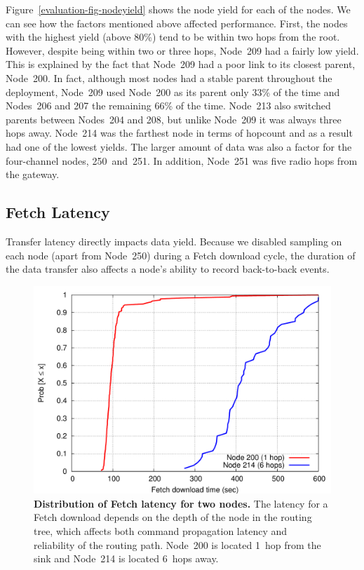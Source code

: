 Figure~\ref{evaluation-fig-nodeyield} shows the node yield for each of the
nodes. We can see how the factors mentioned above affected performance.
First, the nodes with the highest yield (above 80\%) tend to be within two
hops from the root. However, despite being within two or three hops, Node~209
had a fairly low yield. This is explained by the fact that Node~209 had a
poor link to its closest parent, Node~200. In fact, although most nodes had a
stable parent throughout the deployment, Node~209 used Node~200 as its parent
only 33\% of the time and Nodes~206 and 207 the remaining 66\% of the time.
Node~213 also switched parents between Nodes~204 and 208, but unlike Node~209
it was always three hops away. Node~214 was the farthest node in terms of
hopcount and as a result had one of the lowest yields. The larger amount of
data was also a factor for the four-channel nodes, 250~and~251. In addition,
Node~251 was five radio hops from the gateway.


\subsection{Fetch Latency}

Transfer latency directly impacts data yield. Because we disabled sampling on
each node (apart from Node~250) during a Fetch download cycle, the duration
of the data transfer also affects a node's ability to record back-to-back
events.

\begin{figure}[t]
\begin{center}
\includegraphics[width=\hsize]{./3-evaluation/figs/fetchlatency.pdf}
\end{center}

\caption{\textbf{Distribution of Fetch latency for two nodes.} The latency
for a Fetch download depends on the depth of the node in the routing tree,
which affects both command propagation latency and reliability of the routing
path. Node~200 is located 1~hop from the sink and Node~214 is located 6~hops
away.}

\label{evaluation-fig-fetchlatency}
\end{figure}

